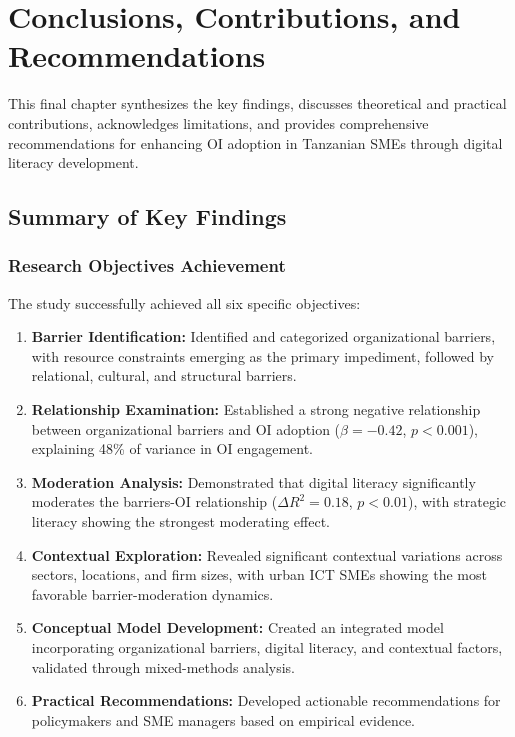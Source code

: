 \chapter{Conclusions, Contributions, and Recommendations}

This final chapter synthesizes the key findings, discusses theoretical and practical contributions, acknowledges limitations, and provides comprehensive recommendations for enhancing OI adoption in Tanzanian SMEs through digital literacy development.

\section{Summary of Key Findings}

\subsection{Research Objectives Achievement}

The study successfully achieved all six specific objectives:

\begin{enumerate}
    \item \textbf{Barrier Identification:} Identified and categorized organizational barriers, with resource constraints emerging as the primary impediment, followed by relational, cultural, and structural barriers.

    \item \textbf{Relationship Examination:} Established a strong negative relationship between organizational barriers and OI adoption ($\beta = -0.42$, $p < 0.001$), explaining 48\% of variance in OI engagement.

    \item \textbf{Moderation Analysis:} Demonstrated that digital literacy significantly moderates the barriers-OI relationship ($\Delta R^2 = 0.18$, $p < 0.01$), with strategic literacy showing the strongest moderating effect.

    \item \textbf{Contextual Exploration:} Revealed significant contextual variations across sectors, locations, and firm sizes, with urban ICT SMEs showing the most favorable barrier-moderation dynamics.

    \item \textbf{Conceptual Model Development:} Created an integrated model incorporating organizational barriers, digital literacy, and contextual factors, validated through mixed-methods analysis.

    \item \textbf{Practical Recommendations:} Developed actionable recommendations for policymakers and SME managers based on empirical evidence.
\end{enumerate}


